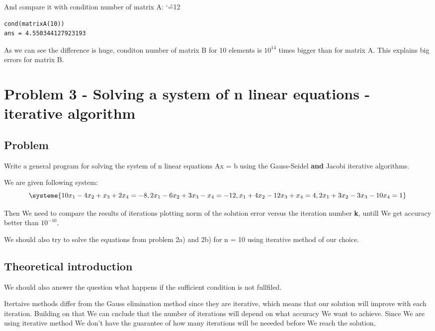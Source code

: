 \documentclass[12pt]{report}
\newenvironment{simplechar}{%
   \catcode`\^=12
}{}
\begin{document}
And compare it with condition number of matrix A:
\begin{simplechar}
\begin{lstlisting}
cond(matrixA(10))
ans = 4.550344127923193
\end{lstlisting}
\end{simplechar}
As we can see the difference is huge, conditon number of matrix B for 10 elements is $10^{14}$ times bigger than for matrix A. This explains big errors for matrix B.











\chapter{Problem 3 - Solving a system of n linear equations - iterative algorithm}

\section{Problem}
Write a general program for solving the system of n linear equations Ax = b using the Gauss-Seidel \textbf{and} Jacobi iterative algorithms.

We are given following system:
\[
\systeme{10x_1-4x_2+x_3+2x_4=-8, 2x_1-6x_2+3x_3-x_4=-12, x_1+4x_2-12x_3+x_4=4, 2x_1+3x_2-3x_3-10x_4=1}
\]

Then We need to compare the results of iterations plotting norm of the solution error versus the iteration number \textbf{k}, untill We get accuracy better than $10^{-10}$.

We should also try to solve the equations from problem 2a) and 2b) for n = 10 using iterative method of our choice.


\section{Theoretical introduction}

 We should also answer the question what happens if the sufficient condition is not fullfiled.

Itertaive methods differ from the Gauss elimination method since they are iterative, which means that our solution will improve with each iteration. Building on that We can cnclude that the number of iterations will depend on what accuracy We want to achieve. Since We are using iterative method We don't have the guarantee of how many iterations will be neeeded before We reach the solution,
\end{document}
